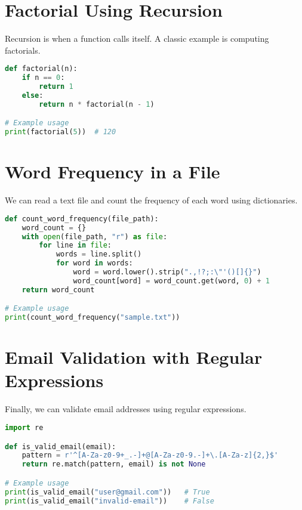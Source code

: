 \section{Factorial Using Recursion}

Recursion is when a function calls itself. A classic example is computing factorials.

\begin{lstlisting}[language=Python, caption={Factorial with recursion}]
def factorial(n):
    if n == 0:
        return 1
    else:
        return n * factorial(n - 1)

# Example usage
print(factorial(5))  # 120
\end{lstlisting}

\section{Word Frequency in a File}

We can read a text file and count the frequency of each word using dictionaries.

\begin{lstlisting}[language=Python, caption={Word frequency counter}]
def count_word_frequency(file_path):
    word_count = {}
    with open(file_path, "r") as file:
        for line in file:
            words = line.split()
            for word in words:
                word = word.lower().strip(".,!?;:\"'()[]{}")
                word_count[word] = word_count.get(word, 0) + 1
    return word_count

# Example usage
print(count_word_frequency("sample.txt"))
\end{lstlisting}

\section{Email Validation with Regular Expressions}

Finally, we can validate email addresses using regular expressions.

\begin{lstlisting}[language=Python, caption={Email validation}]
import re

def is_valid_email(email):
    pattern = r'^[A-Za-z0-9+_.-]+@[A-Za-z0-9.-]+\.[A-Za-z]{2,}$'
    return re.match(pattern, email) is not None

# Example usage
print(is_valid_email("user@gmail.com"))   # True
print(is_valid_email("invalid-email"))    # False
\end{lstlisting}

